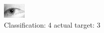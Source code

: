 \begin{figure}[h!]
\begin{center}
\includegraphics[width=0.60\columnwidth]{figures/ID1335_class_4_target_3.png}
\end{center}
\caption{ Classification: 4 actual target: 3}
\label{fig:ID1335_class_4_target_3}
\end{figure}
